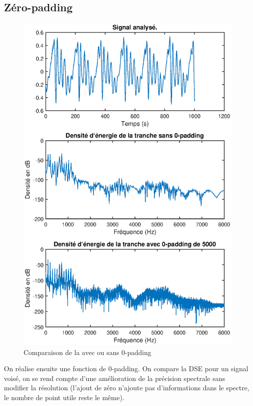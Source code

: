\documentclass[french]{article}
\begin{document}
\subsection{Zéro-padding}
\begin{figure}[h!]
	\centering
	\includegraphics[width=\textwidth]{images/comp_0_padding.eps}
	\caption{Comparaison de la  avec ou sans 0-padding}
	\label{fig:dse_0_padding}
\end{figure}
On réalise ensuite une fonction de 0-padding. On compare la DSE pour un signal voisé, on se rend compte d'une amélioration de la précision spectrale sans modifier la résolution (l'ajout de zéro n'ajoute pas d'informations dans le spectre, le nombre de point utile reste le même).
\end{document}
